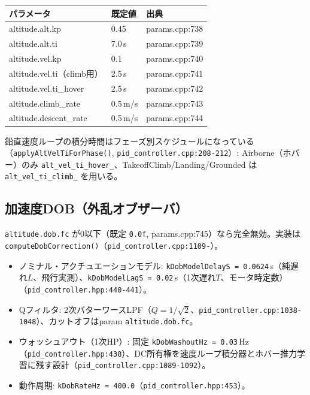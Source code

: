 \documentclass[a4paper,10pt]{ltjsarticle}
\begin{document}
\begin{table}[h]
\centering\footnotesize
\begin{tabularx}{\textwidth}{@{}llY@{}}
\toprule
パラメータ & 既定値 & 出典 \\
\midrule
altitude.alt.kp & 0.45 & params.cpp:738 \\
altitude.alt.ti & 7.0\,s & params.cpp:739 \\
altitude.vel.kp & 0.1 & params.cpp:740 \\
altitude.vel.ti（climb用） & 2.5\,s & params.cpp:741 \\
altitude.vel.ti\_hover & 2.5\,s & params.cpp:742 \\
altitude.climb\_rate & 0.5\,m/s & params.cpp:743 \\
altitude.descent\_rate & 0.5\,m/s & params.cpp:744 \\
\bottomrule
\end{tabularx}
\end{table}

鉛直速度ループの積分時間はフェーズ別スケジュールになっている（\texttt{applyAltVelTiForPhase()}, \texttt{pid\_controller.cpp:208-212}）: Airborne（ホバー）のみ \texttt{alt\_vel\_ti\_hover\_}、TakeoffClimb/Landing/Grounded は \texttt{alt\_vel\_ti\_climb\_} を用いる。

\subsection{加速度DOB（外乱オブザーバ）}

\texttt{altitude.dob.fc} が0以下（既定 \texttt{0.0f}, params.cpp:745）なら完全無効。実装は \texttt{computeDobCorrection()}（\texttt{pid\_controller.cpp:1109-}）。

\begin{itemize}[leftmargin=*]
  \item ノミナル・アクチュエーションモデル: \texttt{kDobModelDelayS = 0.0624}\,s（純遅れ$L$、飛行実測）、\texttt{kDobModelLagS = 0.02}\,s（1次遅れ$T$、モータ時定数）（\texttt{pid\_controller.hpp:440-441}）。
  \item Qフィルタ: 2次バターワースLPF（$Q=1/\sqrt{2}$、\texttt{pid\_controller.cpp:1038-1048}）、カットオフはparam \texttt{altitude.dob.fc}。
  \item ウォッシュアウト（1次HP）: 固定 \texttt{kDobWashoutHz = 0.03}\,Hz（\texttt{pid\_controller.hpp:438}）、DC所有権を速度ループ積分器とホバー推力学習に残す設計（\texttt{pid\_controller.cpp:1089-1092}）。
  \item 動作周期: \texttt{kDobRateHz = 400.0}（\texttt{pid\_controller.hpp:453}）。
\end{itemize}
\end{document}
